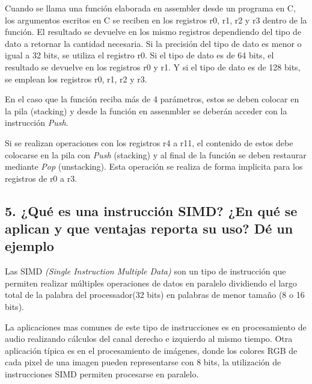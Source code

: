 \documentclass[10pt,a4paper,twoside,spanish]{article}	%
\begin{document}
Cuando se llama una función elaborada en assembler desde un programa en C, los argumentos escritos en C se reciben en los registros r0, r1, r2 y r3 dentro de la función. El resultado se devuelve en los mismo registros dependiendo del tipo de dato a retornar la cantidad necesaria. Si la precisión del tipo de dato es menor o igual a 32 bits, se utiliza el registro r0. Si el tipo de dato es de 64 bits, el resultado se devuelve en los registros r0 y r1. Y si el tipo de dato es de 128 bits, se emplean los registros r0, r1, r2 y r3.

En el caso que la función reciba más de 4 parámetros, estos se deben  colocar en la pila (stacking) y desde la función en assenmbler se deberán acceder con la instrucción \textit{Push}.

Si se realizan operaciones con los registros r4 a r11, el contenido de estos debe colocarse en la pila con \textit{Push} (stacking) y al final de la  función se deben restaurar mediante \textit{Pop} (unstacking). Esta operación se realiza de forma implicita para los registros de r0 a r3.


\subsection*{5. ¿Qué es una instrucción SIMD? ¿En qué se aplican y que ventajas reporta su uso? Dé un ejemplo}

Las SIMD \textit{(Single Instruction Multiple Data)} son un tipo de instrucción que permiten realizar múltiples operaciones de datos en paralelo dividiendo el largo total de la palabra del processador(32 bits) en palabras de menor tamaño (8 o 16 bits).

La aplicaciones mas comunes de este tipo de instrucciones es en procesamiento de audio realizando cálculos del canal derecho e izquierdo al mismo tiempo. Otra aplicación típica es en el procesamiento de imágenes, donde los colores RGB de cada pixel de una imagen pueden representarse con 8 bits, la utilización de instrucciones SIMD permiten procesarse en paralelo.
\end{document}
